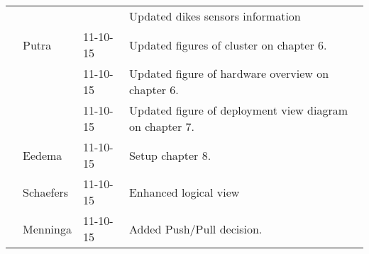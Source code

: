 \begin{longtable}{L{} L{} L{} L{}}
        &           &          & Updated dikes sensors information \\
        & Putra     & 11-10-15 & Updated figures of cluster on chapter 6.\\
        &           & 11-10-15 & Updated figure of hardware overview on chapter 6.\\
        &           & 11-10-15 & Updated figure of deployment view diagram on chapter 7.\\
        & Eedema    & 11-10-15 & Setup chapter 8.\\
        & Schaefers & 11-10-15 & Enhanced logical view \\
        & Menninga  & 11-10-15 & Added Push/Pull decision. \\
    
    \bottomrule
\end{longtable}